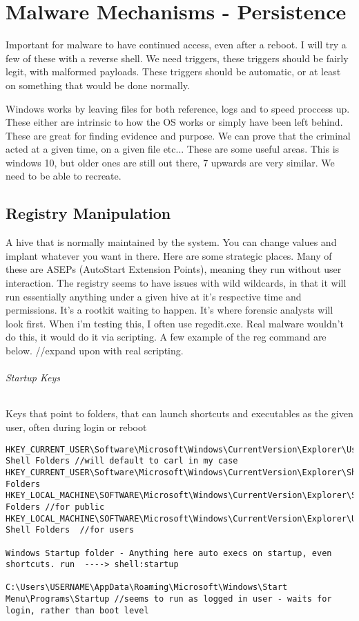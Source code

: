 \chapter{Malware Mechanisms - Persistence}
Important for malware to have continued access, even after a reboot. I will try a few of these with a reverse shell. 
We need triggers, these triggers should be fairly legit, with malformed payloads. These triggers should be automatic, or at least on something that would be done normally.

Windows works by leaving files for both reference, logs and to speed proccess up. These either are intrinsic to how the OS works or simply have been left behind. 
These are great for finding evidence and purpose. We can prove that the criminal acted at a given time, on a given file etc... These are some useful areas. This is windows 10, but older ones are still out there, 7 upwards are very similar. We need to be able to recreate.

\section{Registry Manipulation}
A hive that is normally maintained by the system. You can change values and implant whatever you want in there. Here are some strategic places. 
Many of these are ASEPs (AutoStart Extension Points), meaning they run without user interaction. The registry seems to have issues with wild wildcards, 
in that it will run essentially anything under a given hive at it's respective time and permissions. It's a rootkit waiting to happen. 
It's where forensic analysts will look first. When i'm testing this, I often use regedit.exe. Real malware wouldn't do this, it would do it via scripting. 
A few example of the reg command are below. 
//expand upon with real scripting.


\subparagraph{Startup Keys}
Keys that point to folders, that can launch shortcuts and executables as the given user, often during login or reboot
\begin{lstlisting}[label=RegistryStartupKeys,caption=Registry Startup Key Locations]
HKEY_CURRENT_USER\Software\Microsoft\Windows\CurrentVersion\Explorer\User Shell Folders //will default to carl in my case
HKEY_CURRENT_USER\Software\Microsoft\Windows\CurrentVersion\Explorer\Shell Folders
HKEY_LOCAL_MACHINE\SOFTWARE\Microsoft\Windows\CurrentVersion\Explorer\Shell Folders //for public
HKEY_LOCAL_MACHINE\SOFTWARE\Microsoft\Windows\CurrentVersion\Explorer\User Shell Folders  //for users

Windows Startup folder - Anything here auto execs on startup, even shortcuts. run  ----> shell:startup

C:\Users\USERNAME\AppData\Roaming\Microsoft\Windows\Start Menu\Programs\Startup //seems to run as logged in user - waits for login, rather than boot level

\end{lstlisting}

